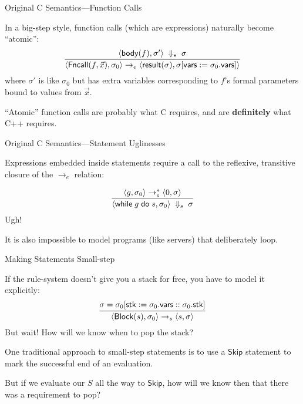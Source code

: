 \documentclass[compress,dvips,color=usenames,xcolor=dvipsnames]{beamer}
\newcommand{\cpp}{\mbox{C\hspace{-.1em}+\hspace{-.05em}+}}
\begin{document}
\begin{frame}{Original C Semantics---Function Calls}

  In a big-step style, function calls (which are expressions)
  naturally become ``atomic'':
  \[
  \infer{
    \langle \textsf{Fncall}(f,\vec{x}), \sigma_0 \rangle \rightarrow_e
    \langle \textsf{result}(\sigma),
    \sigma[\textsf{vars} := \sigma_0.\textsf{vars}]
    \rangle
  }{
    \langle \textsf{body}(f), \sigma'\rangle \;\Downarrow_s\; \sigma
  }
\]
where $\sigma'$ is like $\sigma_0$ but has extra variables
corresponding to $f$'s formal parameters bound to values from
$\vec{x}$.

\bigskip
``Atomic'' function calls are probably what C requires, and are
\textbf{definitely} what \cpp{} requires.


\end{frame}

\begin{frame}{Original C Semantics---Statement Uglinesses}

  Expressions embedded inside statements require a call to the
  reflexive, transitive closure of the $\rightarrow_e$ relation:

\[
\infer{
  \langle\textsf{while}\;g \;\textsf{do}\;s,\sigma_0\rangle
  \;\Downarrow_s\;
  \sigma
}{
  \langle g, \sigma_0 \rangle \rightarrow_e^* \langle 0, \sigma\rangle
}
\]
Ugh!

\bigskip It is also impossible to model programs (like servers) that
deliberately loop.

\end{frame}

\begin{frame}{Making Statements Small-step}

If the rule-system doesn't give you a stack for free, you have to
model it explicitly:
\[
\infer{
  \langle \textsf{Block}(s), \sigma_0 \rangle \rightarrow_s
  \langle s, \sigma\rangle
}{
  \sigma =
  \sigma_0[\textsf{stk} := \sigma_0.\textsf{vars} :: \sigma_0.\textsf{stk}]
}
\]
But wait!  How will we know when to pop the stack?

\bigskip
One traditional approach to small-step statements is to use a
$\textsf{Skip}$ statement to mark the successful end of an
evaluation.

\bigskip But if we evaluate our $S$ all the way to $\textsf{Skip}$,
how will we know then that there was a requirement to pop?

\end{frame}
\end{document}
